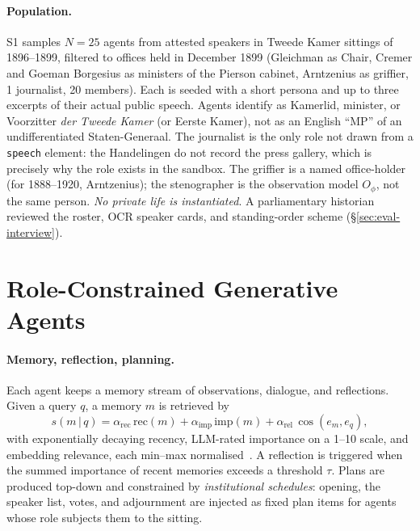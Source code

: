 \documentclass[sigconf,review,anonymous]{acmart}
\begin{document}
\paragraph{Population.} S1 samples $N{=}25$ agents from attested speakers
in Tweede Kamer sittings of 1896--1899, filtered to offices held in
December 1899 (Gleichman as Chair, Cremer and Goeman Borgesius as
ministers of the Pierson cabinet, Arntzenius as griffier, 1 journalist,
20 members). Each is seeded with a short persona and up to three
excerpts of their actual public speech. Agents identify as Kamerlid,
minister, or Voorzitter \emph{der Tweede Kamer} (or Eerste Kamer), not as
an English ``MP'' of an undifferentiated Staten-Generaal. The journalist is
the only role not drawn from a \texttt{speech} element: the Handelingen do
not record the press gallery, which is precisely why the role exists in the
sandbox. The griffier is a named office-holder (for 1888--1920,
Arntzenius); the stenographer is the observation model
$O_\phi$, not the same person. \emph{No private life is instantiated}.
A parliamentary historian reviewed the roster, OCR speaker cards, and
standing-order scheme (\S\ref{sec:eval-interview}).

\section{Role-Constrained Generative Agents}
\label{sec:agents}

\paragraph{Memory, reflection, planning.} Each agent keeps a memory stream
of observations, dialogue, and reflections. Given a query $q$, a memory $m$
is retrieved by
\begin{equation}
s(m\,|\,q)=\alpha_{\text{rec}}\,\text{rec}(m)+\alpha_{\text{imp}}\,\text{imp}(m)+\alpha_{\text{rel}}\,\cos(e_m,e_q),
\label{eq:retrieval}
\end{equation}
with exponentially decaying recency, LLM-rated importance on a 1--10 scale,
and embedding relevance, each min--max normalised~\cite{park2023generative}.
A reflection is triggered when the summed importance of recent memories
exceeds a threshold $\tau$. Plans are produced top-down and constrained by
\emph{institutional schedules}: opening, the speaker list, votes, and
adjournment are injected as fixed plan items for agents whose role subjects
them to the sitting.
\end{document}
